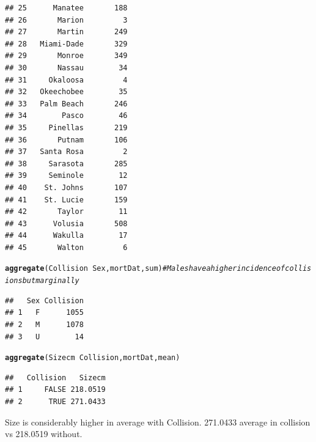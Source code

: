 \documentclass{article}\usepackage[]{graphicx}\usepackage[]{color}
\makeatletter
\newcommand{\hlcom}[1]{\textcolor[rgb]{0.678,0.584,0.686}{\textit{#1}}}%
\newcommand{\hlopt}[1]{\textcolor[rgb]{0,0,0}{#1}}%
\newcommand{\hlstd}[1]{\textcolor[rgb]{0.345,0.345,0.345}{#1}}%
\newcommand{\hlkwd}[1]{\textcolor[rgb]{0.737,0.353,0.396}{\textbf{#1}}}%
\newenvironment{kframe}{%
 \def\at@end@of@kframe{}%
 \ifinner\ifhmode%
  \def\at@end@of@kframe{\end{minipage}}%
  \begin{minipage}{\columnwidth}%
 \fi\fi%
 \def\FrameCommand##1{\hskip\@totalleftmargin \hskip-\fboxsep
 \colorbox{shadecolor}{##1}\hskip-\fboxsep
     \hskip-\linewidth \hskip-\@totalleftmargin \hskip\columnwidth}%
 \MakeFramed {\advance\hsize-\width
   \@totalleftmargin\z@ \linewidth\hsize
   \@setminipage}}%
 {\par\unskip\endMakeFramed%
 \at@end@of@kframe}
\newenvironment{knitrout}{}{} %
\makeatother
\begin{document}
\begin{knitrout}
\begin{kframe}
\begin{verbatim}
## 25      Manatee       188
## 26       Marion         3
## 27       Martin       249
## 28   Miami-Dade       329
## 29       Monroe       349
## 30       Nassau        34
## 31     Okaloosa         4
## 32   Okeechobee        35
## 33   Palm Beach       246
## 34        Pasco        46
## 35     Pinellas       219
## 36       Putnam       106
## 37   Santa Rosa         2
## 38     Sarasota       285
## 39     Seminole        12
## 40    St. Johns       107
## 41    St. Lucie       159
## 42       Taylor        11
## 43      Volusia       508
## 44      Wakulla        17
## 45       Walton         6
\end{verbatim}
\begin{alltt}
\hlkwd{aggregate}\hlstd{(Collision} \hlopt{~} \hlstd{Sex, mortDat, sum)} \hlcom{# Males have a higher incidence of collisions but marginally}
\end{alltt}
\begin{verbatim}
##   Sex Collision
## 1   F      1055
## 2   M      1078
## 3   U        14
\end{verbatim}
\begin{alltt}
\hlkwd{aggregate}\hlstd{(Sizecm} \hlopt{~} \hlstd{Collision, mortDat, mean)}
\end{alltt}
\begin{verbatim}
##   Collision   Sizecm
## 1     FALSE 218.0519
## 2      TRUE 271.0433
\end{verbatim}
\end{kframe}
\end{knitrout}
Size is considerably higher in average with Collision. 271.0433 average in collision vs 218.0519 without. 
\end{document}
